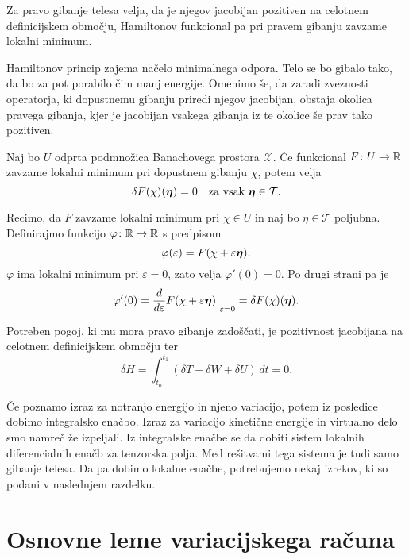 \begin{aksiom}
	Za pravo gibanje telesa velja, da je njegov jacobijan pozitiven na
	celotnem definicijskem območju, Hamiltonov funkcional pa pri pravem gibanju
	zavzame lokalni minimum.
\end{aksiom}

Hamiltonov princip zajema načelo minimalnega odpora. Telo se bo gibalo tako, da
bo za pot porabilo čim manj energije. Omenimo še, da zaradi zveznosti operatorja,
ki dopustnemu gibanju priredi njegov jacobijan, obstaja okolica pravega gibanja,
kjer je jacobijan vsakega gibanja iz te okolice še prav tako pozitiven.

\begin{trditev}
	Naj bo $U$ odprta podmnožica Banachovega prostora $\mathcal{X}$.
	Če funkcional $F\colon U\to\mathbb R$ zavzame lokalni minimum pri dopustnem gibanju $\chi$, potem velja
	\[ \delta F(\chi)(\vek{\eta})=0\quad\textrm{za vsak}\ \vek{\eta}\in\mathcal{T}. \]
\end{trditev}

\proof
	Recimo, da $F$ zavzame lokalni minimum pri $\chi\in U$ in naj bo $\eta\in\mathcal{T}$ poljubna.
	Definirajmo funkcijo $\varphi\colon\mathbb R\to\mathbb R$ s predpisom
	\[ \varphi(\varepsilon)=F(\chi+\varepsilon\boldsymbol \eta). \]
	$\varphi$ ima lokalni minimum pri $\varepsilon=0$, zato velja $\varphi'(0)=0.$
	Po drugi strani pa je
	\[
		\varphi'(0)=\frac{d}{d\varepsilon}F(\chi+\varepsilon\boldsymbol \eta)\Big|_{\varepsilon=0}=
		\delta F(\chi)(\boldsymbol \eta).
	\]
\endproof

\begin{posledica}
	Potreben pogoj, ki mu mora pravo gibanje zadoščati, je pozitivnost jacobijana
	na celotnem definicijskem območju ter
	\[ \delta H = \int_{t_0}^{t_1}(\delta T+\delta W+\delta U)\,dt = 0. \]
\end{posledica}

Če poznamo izraz za notranjo energijo in njeno variacijo, potem iz posledice
dobimo integralsko enačbo. Izraz za variacijo kinetične energije in virtualno delo 
smo namreč že izpeljali. Iz integralske enačbe se da dobiti sistem lokalnih diferencialnih enačb
za tenzorska polja. Med rešitvami tega sistema je tudi samo gibanje telesa.
Da pa dobimo lokalne enačbe, potrebujemo nekaj izrekov, ki so podani v naslednjem razdelku.


\section{Osnovne leme variacijskega računa}


